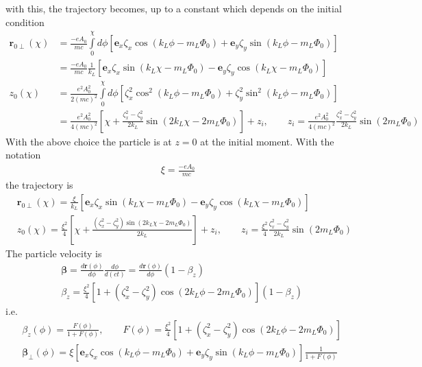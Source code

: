 with this, the trajectory becomes, up to a constant which depends on the initial condition
\begin{align}
    {\bm r}_{0\perp}(\chi) & =\frac{-eA_0}{mc}\int\limits_{0}^\chi d\phi\left[ {\bm e}_x\zeta_x \cos(k_L\phi-m_L\varPhi_0)+{\bm e}_y\zeta_y\sin(k_L\phi-m_L\varPhi_0)\right]\nonumber                                              \\
                           & =\frac{-eA_0}{mc}\frac1{k_L}\left[{\bm e}_x\zeta_x\sin(k_L\chi-m_L\varPhi_0)-{\bm e}_y\zeta_y\cos(k_L\chi-m_L\varPhi_0)\right]\nonumber                                                               \\
    z_0(\chi)              & = \frac{e^2A_0^2}{2(mc)^2}\int\limits_0^\chi d\phi\left[\zeta_x^2\cos^2(k_L\phi-m_L\varPhi_0)+\zeta_y^2\sin^2(k_L\phi-m_L\varPhi_0)\right]\nonumber                                                   \\
                           & =\frac{e^2A_0^2}{4(mc)^2}\left[\chi+\frac{\zeta_x^2-\zeta_y^2}{2k_L}\sin(2k_L\chi-2m_L\varPhi_0)\right]+z_i, \qquad z_i = \frac{e^2A_0^2}{4(mc)^2}\frac{\zeta_x^2-\zeta_y^2}{2k_L}\sin(2m_L\varPhi_0)
\end{align}
With the above choice the particle is at $z=0$ at the initial moment. With the notation
\begin{align}
    \xi = \frac{-e A_0}{mc}
\end{align}
the trajectory is
\begin{align}
     & {\bm r}_{0\perp}(\chi)=\frac{\xi}{k_L}\left[{\bm e}_x\zeta_x\sin(k_L\chi-m_L\varPhi_0)-{\bm e}_y\zeta_y\cos(k_L\chi-m_L\varPhi_0)\right]                                                  \\
     & z_0(\chi)=\frac{\xi^2}4\left[\chi+\frac{(\zeta_x^2-\zeta_y^2)\sin(2k_L\chi-2m_L\varPhi_0)}{2k_L}\right]+z_i,\qquad z_i = \frac{\xi^2}4\frac{\zeta_x^2-\zeta_y^2}{2k_L}\sin(2m_L\varPhi_0)
\end{align}
The particle velocity is
\begin{align}
     & {\boldsymbol\beta}=\frac{d{\bm r}(\phi)}{d\phi}\frac{d\phi}{d (ct)}=\frac{d{\bm r}(\phi)}{d\phi}(1-\beta_z) \\
     & \beta_z =\frac{\xi^2}4\left[1+(\zeta_x^2-\zeta_y^2)\cos(2k_L\phi-2m_L\varPhi_0)\right](1-\beta_z)
\end{align}
i.e.
\begin{align}
     & \beta_z(\phi) =\frac{F(\phi)}{1+F(\phi)},\qquad F(\phi) = \frac{\xi^2}4\left[1+(\zeta_x^2-\zeta_y^2)\cos(2k_L\phi-2m_L\varPhi_0)\right]                 \\
     & {\boldsymbol{\beta}}_\perp(\phi)=\xi\left[{\bm e}_x\zeta_x\cos(k_L\phi-m_L\varPhi_0)+{\bm e}_y\zeta_y\sin(k_L\phi-m_L\varPhi_0)\right]\frac1{1+F(\phi)}
\end{align}

